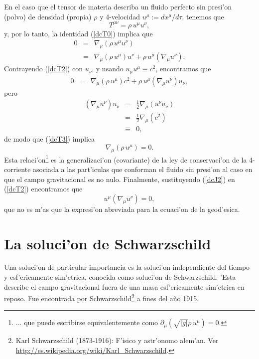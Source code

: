 En el caso que el tensor de materia describa un fluido perfecto sin presi'on
(polvo) de densidad (propia) $\rho$ y 4-velocidad
$u^\mu:={dx^\mu}/{d\tau}$, tenemos que
\begin{equation}
 T^{\mu\nu}=\rho\,u^\mu u^\nu,
\end{equation}
y, por lo tanto, la identidad (\ref{dcT0}) implica que
\begin{eqnarray}
 0&=&\nabla_\mu(\rho\,u^\mu u^\nu) \\
&=& \nabla_\mu(\rho\,u^\mu) u^\nu+ \rho\,u^\mu(\nabla_\mu u^\nu). \label{dcT2}
\end{eqnarray}
Contrayendo (\ref{dcT2}) con $u_\nu$, y usando $u_\mu u^\mu\equiv c^2$,
encontramos que
\begin{eqnarray}
 0&=&\nabla_\mu(\rho\,u^\mu) c^2+ \rho\,u^\mu(\nabla_\mu u^\nu)u_\nu,
\label{dcT3}
\end{eqnarray}
pero
\begin{eqnarray}
(\nabla_\mu u^\nu)u_\nu&=&\frac{1}{2}\nabla_\mu(u^\nu u_\nu)\\
&=&\frac{1}{2}\nabla_\mu(c^2) \\
&\equiv& 0,
\end{eqnarray}
de modo que (\ref{dcT3}) implica
\begin{equation}
 \nabla_\mu(\rho\,u^\mu)=0. \label{dcJ2}
\end{equation}
Esta relaci'on\footnote{... que puede escribirse equivalentemente como $\partial_\mu(\sqrt{|g|}\rho\,u^\mu)=0$.} es la generalizaci'on (covariante) de la ley de conservaci'on de
la 4-corriente asociada a las part'iculas que conforman el fluido sin presi'on
al caso en que el campo gravitacional es no nulo. Finalmente, sustituyendo
(\ref{dcJ2}) en (\ref{dcT2}) encontramos que
\begin{equation}
 u^\mu(\nabla_\mu u^\nu)=0,
\end{equation}
que no es m'as que la expresi'on abreviada para la ecuaci'on de la geod'esica.


\section{La soluci'on de Schwarzschild}\label{solucion_sch}

Una soluci'on de particular importancia es la soluci'on
independiente del tiempo y esf'ericamente sim'etrica, conocida como soluci'on de
Schwarzschild. 'Esta describe el campo gravitacional fuera de una masa
esf'ericamente sim'etrica en reposo. Fue encontrada por Schwarzschild\footnote{Karl
Schwarzschild (1873-1916): F'isico y astr'onomo alem'an. Ver
\url{http://es.wikipedia.org/wiki/Karl\_Schwarzschild}.} a fines del a\~no 1915.

